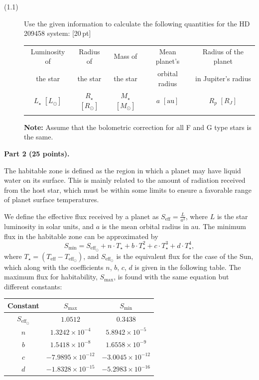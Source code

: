\begin{description}
\item[(1.1)] Use the given information to calculate the following quantities
  for the HD\,209458 system: \hfill[20\,pt]

  \begin{center}
  \begin{tabular}{ccccc}
  \toprule
  Luminosity of & Radius of & Mass of & Mean planet's & Radius of the planet\\
  the star & the star & the star & orbital radius & in Jupiter's radius\\
  $L_\star$ $[L_\odot]$ & $R_\star$ $[R_\odot]$ & $M_\star$ $[M_\odot]$
    & $a$ $[\mathrm{au}]$ & $R_p$ $[R_J]$\\
  \midrule
  \phantom{xxxx} & \phantom{xxxx} & \phantom{xxxx} & \phantom{xxxx}
    & \phantom{xxxx}\\
  \bottomrule
  \end{tabular}
  \end{center}

  \textbf{Note:} Assume that the bolometric correction for all F and G type
  stars is the same.
\end{description}

\medskip
\noindent\textbf{Part 2 (25 points).}

The habitable zone is defined as the region in which a planet may have liquid
water on its surface. This is mainly related to the amount of radiation
received from the host star, which must be within some limits to ensure a
favorable range of planet surface temperatures.

We define the effective flux received by a planet as
$S_{\mathrm{eff}} = \frac{L}{a^2}$, where $L$ is the star luminosity in solar
units, and $a$ is the mean orbital radius in au. The minimum flux in the
habitable zone can be approximated by
\[
S_{\mathrm{min}} = S_{\mathrm{eff}_\odot} + n\cdot T_\star + b\cdot T_\star^2
  + c\cdot T_\star^3 + d\cdot T_\star^4,
\]
where $T_\star = (T_{\mathrm{eff}} - T_{\mathrm{eff}_\odot})$, and
$S_{\mathrm{eff}_\odot}$ is the equivalent flux for the case of the Sun, which
along with the coefficients $n$, $b$, $c$, $d$ is given in the following
table. The maximum flux for habitability, $S_{\mathrm{max}}$, is found with the
same equation but different constants:

\begin{center}
\begin{tabular}{ccc}
\toprule
Constant & $S_{\mathrm{max}}$ & $S_{\mathrm{min}}$\\
\midrule
$S_{\mathrm{eff}_\odot}$ & $1.0512$ & $0.3438$\\
$n$ & $1.3242\times10^{-4}$ & $5.8942\times10^{-5}$\\
$b$ & $1.5418\times10^{-8}$ & $1.6558\times10^{-9}$\\
$c$ & $-7.9895\times10^{-12}$ & $-3.0045\times10^{-12}$\\
$d$ & $-1.8328\times10^{-15}$ & $-5.2983\times10^{-16}$\\
\bottomrule
\end{tabular}
\end{center}

